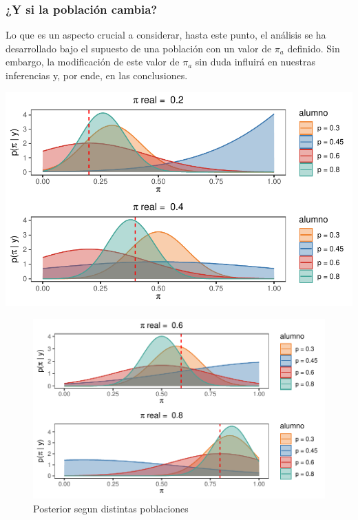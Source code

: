 \documentclass[
]{article}
\begin{document}
\newpage

\subsubsection{¿Y si la población cambia?}\label{subtitulo-8}

Lo que es un aspecto crucial a considerar, hasta este punto, el análisis se ha desarrollado bajo el supuesto de una población con un valor de \(\pi_a\) definido. Sin embargo, la modificación de este valor de \(\pi_a\) sin duda influirá en nuestras inferencias y, por ende, en las conclusiones.

\begin{center}\includegraphics{TP-1--Bayes_files/figure-latex/unnamed-chunk-6-1} \end{center}
\begin{figure}

{\centering \includegraphics{TP-1--Bayes_files/figure-latex/fig5-1} 

}

\caption{Posterior segun distintas poblaciones}\label{fig:fig5}
\end{figure}
\end{document}
